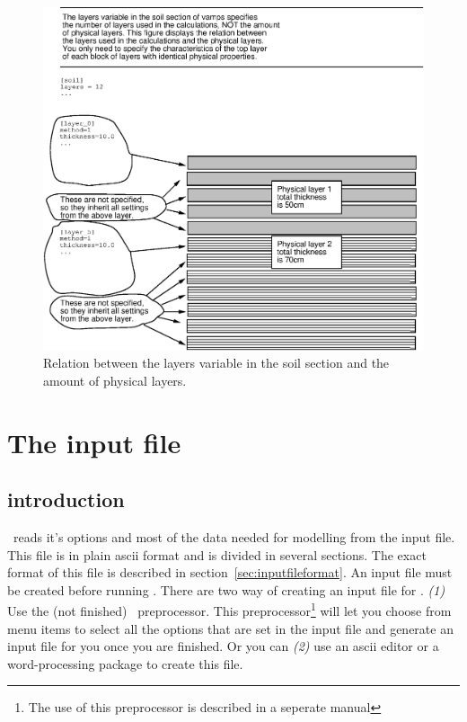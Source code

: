\begin{figure}
\centerline{\includegraphics{psfig/layers.eps}}
\caption{Relation between the layers variable in the soil section and
the amount of physical layers.}
\label{fig:layers}
\end{figure}


\chapter{The input file}

\section{introduction}

\vamps\ reads it's options and  most of the  data needed for  modelling
from the input file. This file is in plain ascii format and is divided in
several sections. The exact format of this file is described in
section~\ref{sec:inputfileformat}.  An input file must be created before
running \vamps.  There are two way of creating an input file for \vamps.
{\em (1)} Use the (not finished) \vamps\ preprocessor. This
preprocessor\footnote{The use of this preprocessor is described in a
seperate manual} will let you choose from menu items to select all the
options that are set in the input file and generate an input file for you
once you are finished. Or you can {\em (2)} use an ascii editor or a
word-processing package to create this file.



